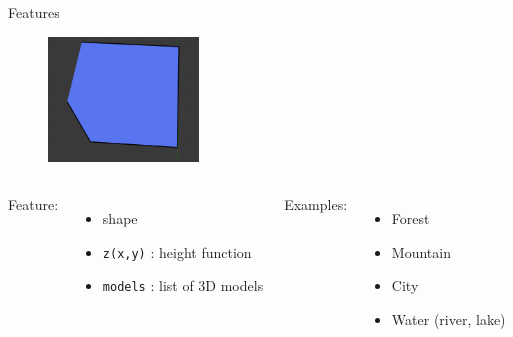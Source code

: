 \documentclass{beamer}
\begin{document}
\begin{frame}{Features}
  \begin{figure}
    \begin{center}
      \includegraphics[width=4cm]{feature}
    \end{center}
  \end{figure}

  \begin{columns}[t]
    Feature:
    \begin{itemize}
      \item {\color{Cerulean}shape}
      \item \texttt{z(x,y)} : height function
      \item \texttt{models} : list of 3D models
    \end{itemize}

    \pause
    Examples:
    \begin{itemize}
      \item Forest
      \item Mountain
      \item City
      \item Water (river, lake)
    \end{itemize}
  \end{columns}
\end{frame}
\end{document}
